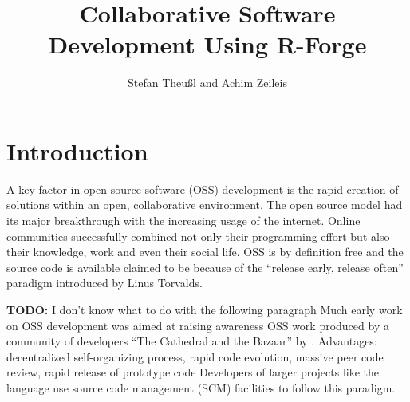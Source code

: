 \title{Collaborative Software Development Using R-Forge}
\author{Stefan Theu\ss{}l and Achim Zeileis}

\maketitle




\section*{Introduction}


A key factor in open source software (OSS) development is the rapid creation
of solutions within an open, collaborative environment. The open
source model had its major breakthrough with the increasing
usage of the internet. Online communities successfully combined
not only their programming effort but also their knowledge, work
and even their social life. OSS is by definition free and
the source code is available
claimed to be  because of the
``release early, release often'' paradigm introduced by Linus
Torvalds.


\textbf{TODO: } I don't know what to do with the following paragraph
Much early work on OSS development was aimed at raising awareness  OSS
work produced by a community of developers ``The Cathedral and the
Bazaar'' by \cite{forge:Raymond:1999}.
Advantages:
decentralized self-organizing process, rapid code evolution, massive
peer code review, rapid release of prototype code
Developers of larger projects like the language \R{} use source code
management (SCM) facilities to follow this paradigm.

